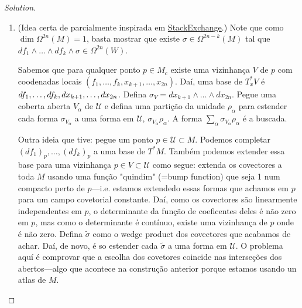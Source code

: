 \begin{proof}[Solution]\leavevmode
	\begin{enumerate}[label=\alph*.]
		\item (Idea certa de parcialmente inspirada em  \href{https://math.stackexchange.com/questions/2857126/df-1-df-k-linearly-independent-rightarrow-frac-omegann-df-1-wedge}{StackExchange}.) Note que como $\dim \Omega^{2n}(M) =1$, basta mostrar que existe $ \sigma\in\Omega^{2n-k}(M)$ tal que $df_1\wedge \ldots \wedge df_k\wedge \sigma\in\Omega^{2n}(W)$.

		Sabemos que para qualquer ponto $p\in M_c$ existe uma vizinhança $V$ de $p$ com coodenadas locais $(f_1,\ldots,f_k,x_{k+1},\ldots,x_{2n})$. Daí, uma base de $T_x^*V$ é $df_1,\ldots,df_k,\\dx_{k+1},\ldots,dx_{2n}$. Defina $\sigma_V=dx_{k+1}\wedge \ldots \wedge dx_{2n}$. Pegue uma coberta aberta $V_\alpha$ de $\mathcal{U}$ e defina uma partição da unidade $\rho_\alpha$ para estender cada forma $\sigma_{V_\alpha}$ a uma forma em $\mathcal{U}$, $\sigma_{V_\alpha}\rho_\alpha$. A forma $\sum_{\alpha}\sigma_{V_\alpha}\rho_\alpha$ é a buscada.


		Outra ideia que tive: pegue um ponto $p\in\mathcal{U}\subset M$. Podemos completar $(df_1)_p,\ldots,(df_k)_p$ a uma base de $T^*M$. Tamb\'em podemos extender essa base para uma vizinhança $p\in V\subset \mathcal{U}$ como segue: extenda os covectores a toda $M$ usando uma fun\c c\~ao "quindim" (=bump function) que seja 1 num compacto perto de $p$---i.e. estamos extendedo essas formas que achamos em $p$ para um campo covetorial constante. Da\'i, como os covectores s\~ao linearmente independentes em $p$, o determinante da fun\c c\~ao de coeficentes deles \'e n\~ao zero em $p$, mas como o determinante \'e cont\'inuo, existe uma vizinhança de $p$ onde \'e n\~ao zero. Defina $\tilde{\sigma}$ como o wedge product dos covectores que acabamos de achar. Daí, de novo, é so estender cada $\tilde{\sigma}$ a uma forma em $\mathcal{U}$. O problema aquí é comprovar que a escolha dos covetores coincide nas interseções dos abertos---algo que acontece na construção anterior porque estamos usando un atlas de $M$.


\end{enumerate}
\end{proof}
